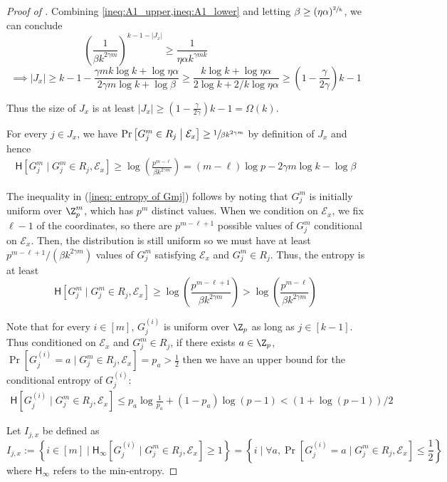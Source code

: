 \documentclass{toc}
\newcommand{\set}[1]{{\left \{{#1} \right \}}}
\newcommand{\st}{\;|\;}
\newcommand{\cond}{\;|\;}
\newcommand{\bigomega}[1]{\ensuremath{{\Omega \left( {#1} \right)}}}
\newcommand{\eqdef}{\ensuremath{:=}}
\newcommand{\entropy}{\ensuremath{\mathsf{H}}}
\newcommand{\Hmin}{\ensuremath{\mathsf{H}_{\infty}}}
\newcommand{\event}{\ensuremath{\mathcal{E}}}
\begin{document}
\begin{proof}[Proof of ]
		Combining \cref{ineq:A1_upper,ineq:A1_lower} 
and letting $\beta\ge (\eta\alpha)^{\sfrac{2}{k}}$, we can conclude
%
\[\left( \frac{1}{\beta k^{2\gamma m}} \right)^{k-1-|J_x|}\ge  \frac{1}{\eta\alpha k^{\gamma mk}} \qquad\qquad\qquad\qquad \]
\[ \implies |J_x|\ge k-1-\frac{\gamma mk\log k+ \log \eta\alpha}{2\gamma m\log k + \log \beta} \ge \frac{k \log k + \log \eta \alpha}{2 \log k + 2/k  \log \eta \alpha} \ge \left(1-\frac{\gamma}{2\gamma}\right)k-1\]

		Thus the size of $J_x$ is at least
		 $|J_x|\ge \left(1-\frac{\gamma}{2\gamma}\right)k-1=\bigomega{k}$.

		For every $j\in J_x$, we have $\Pr\left[G^m_j\in R_j\; \big| \; \event_x\right] \ge \sfrac{1}{\beta k^{2\gamma m}}$ by definition of $J_x$
		and hence 
		\begin{align}\label{ineq: entropy of Gmj}
		\entropy\left[ G^m_j \cond G^m_j\in R_j,\event_x \right] \ge \log\left( \frac{p^{m-\ell}}{\beta k^{2\gamma m}} \right)=(m-\ell)\log p - 2\gamma m\log k - \log \beta
		\end{align}
		
		{\color{black}The inequality in (\ref{ineq: entropy of Gmj}) follows by noting that $G^m_j$ is initially uniform over $\Z_p^m$, which has $p^m$ distinct values. When we condition on $\event_x$, we fix $\ell-1$ of the coordinates, so there are $p^{m-\ell+1}$ possible values of $G^m_j$ conditional on $\event_x$. Then, the distribution is still uniform so we must have at least $p^{m-\ell+1}/\left(\beta k^{2\gamma m}\right)$
		values of $G_j^m$ satisfying $\event_x$ and $G_j^m \in R_j$. Thus, the entropy is at least
		$$\entropy\left[ G^m_j \cond G^m_j\in R_j,\event_x \right] \ge \log\left( \frac{p^{m-\ell+1}}{\beta k^{2\gamma m}} \right) > \log\left( \frac{p^{m-\ell}}{\beta k^{2\gamma m}} \right)$$} 

		Note that for every $i\in[m]$, $G_j^{(i)}$ is uniform over $\Z_p$ as long as $j\in [k-1]$.
		Thus conditioned on $\event_x$ and $G_j^m\in R_j$,
		if there exists $a\in\Z_p$, 
		$\Pr[G_j^{(i)}=a \cond G_j^m\in R_j,\event_x ]=p_a>\frac{1}{2}$ 
		then we have an upper bound for the conditional entropy of $G_j^{(i)} $: 
		\begin{align*}%
			\entropy[G_j^{(i)}\cond G_j^m\in R_j,\event_x ]\le p_a\log\frac{1}{p_a}+(1-p_a)\log(p-1)< (1+\log(p-1))/2
		\end{align*}

		Let $I_{j,x}$ be defined as 
		\[I_{j,x}\eqdef\set{i\in [m] \st \Hmin\left[ G_j^{(i)}\cond G_j^m\in R_j,\event_x  \right]\ge 1 } = \set{i \st \forall a, \Pr\left[ G_j^{(i)}=a\cond G_j^m\in R_j,\event_x  \right]\le \frac{1}{2} }\]
		{\color{black}where $\Hmin$ refers to the min-entropy.} %
		

\end{proof}
\end{document}
